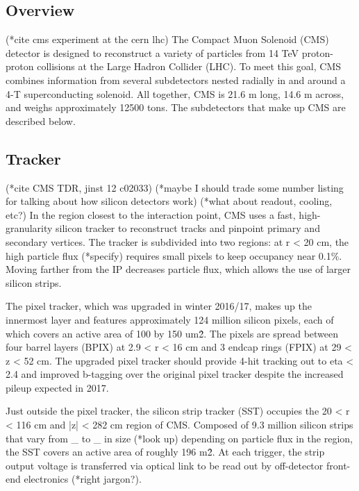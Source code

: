 \documentclass[12pt]{article}
\begin{document}
\subsection{Overview}
    (*cite cms experiment at the cern lhc)
    The Compact Muon Solenoid (CMS) detector is designed to reconstruct a variety of particles from 14 TeV proton-proton collisions at the Large Hadron Collider (LHC). To meet this goal, CMS combines information from several subdetectors nested radially in and around a 4-T superconducting solenoid. All together, CMS is 21.6 m long, 14.6 m across, and weighs approximately 12500 tons. The subdetectors that make up CMS are described below.

\subsection{Tracker}
    (*cite CMS TDR, jinst 12 c02033)
    (*maybe I should trade some number listing for talking about how silicon detectors work)
    (*what about readout, cooling, etc?)
    In the region closest to the interaction point, CMS uses a fast, high-granularity silicon tracker to reconstruct tracks and pinpoint primary and secondary vertices. The tracker is subdivided into two regions: at r < 20 cm, the high particle flux (*specify) requires small pixels to keep occupancy near 0.1\%. Moving farther from the IP decreases particle flux, which allows the use of larger silicon strips.

    The pixel tracker, which was upgraded in winter 2016/17, makes up the innermost layer and features approximately 124 million silicon pixels, each of which covers an active area of 100 by 150 um\^2. The pixels are spread between four barrel layers (BPIX) at 2.9 < r < 16 cm and 3 endcap rings (FPIX) at 29 < z < 52 cm. The upgraded pixel tracker should provide 4-hit tracking out to eta < 2.4 and improved b-tagging over the original pixel tracker despite the increased pileup expected in 2017.
    
    Just outside the pixel tracker, the silicon strip tracker (SST) occupies the 20 < r < 116 cm and |z| < 282 cm region of CMS. Composed of 9.3 million silicon strips that vary from \_ to \_ in size (*look up) depending on particle flux in the region, the SST covers an active area of roughly 196 m\^2. At each trigger, the strip output voltage is transferred via optical link to be read out by off-detector front-end electronics (*right jargon?).
\end{document}
